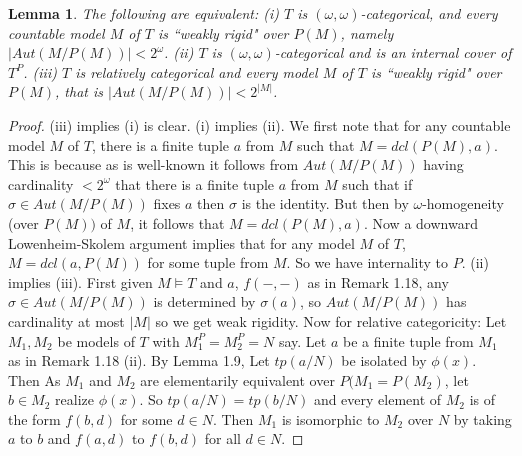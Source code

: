 \documentclass[12pt]{article}
\newtheorem{Lemma}[Theorem]{Lemma}
\begin{document}
\begin{Lemma} The following are equivalent:
\newline
(i) $T$ is $(\omega, \omega)$-categorical, and every countable model $M$ of $T$ is ``weakly rigid" over $P(M)$, namely $|Aut(M/P(M))| < 2^{\omega}$.
\newline
(ii)  $T$ is $(\omega, \omega)$-categorical and is an internal cover of $T^{P}$.
\newline
(iii) $T$ is relatively categorical and every model $M$ of $T$ is ``weakly rigid" over $P(M)$, that is $|Aut(M/P(M))| < 2^{|M|}$. 
\end{Lemma}
\begin{proof} (iii) implies (i) is clear. 
\newline
(i) implies (ii).  We first note that for any countable model $M$ of $T$, there is a finite tuple $a$ from $M$ such that $M = dcl(P(M), a)$.  This is because as is well-known it follows from $Aut(M/P(M))$ having cardinality $< 2^{\omega}$ that there is a finite tuple $a$ from $M$ such that  if $\sigma\in Aut(M/P(M))$ fixes $a$ then $\sigma$ is the identity. But then by $\omega$-homogeneity (over $P(M))$ of $M$, it follows that $M= dcl(P(M),a)$.
Now a downward Lowenheim-Skolem argument implies that  for any model $M$ of $T$,  $M= dcl(a,P(M))$ for some tuple from $M$. So we have internality to $P$. 
\newline
(ii) implies (iii).  First given $M\models T$ and $a$, $f(-,-)$ as in Remark 1.18, any $\sigma\in Aut(M/P(M))$ is determined by $\sigma(a)$, so $Aut(M/P(M))$ has  cardinality at most $|M|$ so we get weak rigidity.
\newline
Now for relative categoricity: Let $M_{1}, M_{2}$ be models of $T$ with $M_{1}^{P} = M_{2}^{P} = N$ say. 
Let $a$ be a finite tuple from $M_{1}$ as in Remark 1.18 (ii). By Lemma 1.9, Let $tp(a/N)$ be isolated by $\phi(x)$. Then As $M_{1}$ and $M_{2}$ are elementarily equivalent over $P(M_{1} = P(M_{2})$, let $b\in M_{2}$ realize $\phi(x)$.
So $tp(a/N) = tp(b/N)$ and every element of $M_{2}$ is of the form $f(b,d)$ for some $d\in N$. Then $M_{1}$ is isomorphic to $M_{2}$ over $N$ by taking $a$ to $b$ and $f(a,d)$ to $f(b,d)$ for all $d\in N$. 




\end{proof} 
\end{document}
